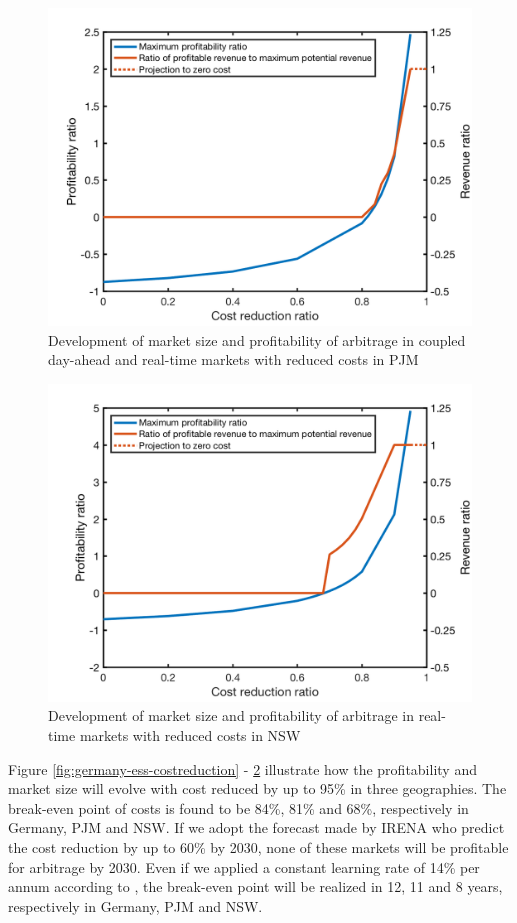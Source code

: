 \begin{figure}[h!]
	\centering
	\includegraphics[width=0.9\linewidth]{Figures/CostReduction_PJM_ESS}
	\caption{Development of market size and profitability of arbitrage in coupled day-ahead and real-time markets with reduced costs in PJM}
	\label{fig:pjm-ess-costreduction}
\end{figure}

\begin{figure}[h!]
	\centering
	\includegraphics[width=0.9\linewidth]{Figures/CostReduction_NSW_ESS}
	\caption{Development of market size and profitability of arbitrage in real-time markets with reduced costs in NSW}
	\label{fig:nsw-ess-costreduction}
\end{figure}

Figure \ref{fig:germany-ess-costreduction} - \ref{fig:nsw-ess-costreduction} illustrate how the profitability and market size will evolve with cost reduced by up to 95\% in three geographies. The break-even point of costs is found to be 84\%, 81\% and 68\%, respectively in Germany, PJM and NSW. If we adopt the forecast made by IRENA\cite{IRENA2017} who predict the cost reduction by up to 60\% by 2030, none of these markets will be profitable for arbitrage by 2030. Even if we applied a constant learning rate of 14\% per annum according to \cite{Nykvist2015}, the break-even point will be realized in 12, 11 and 8 years, respectively in Germany, PJM and NSW. 

